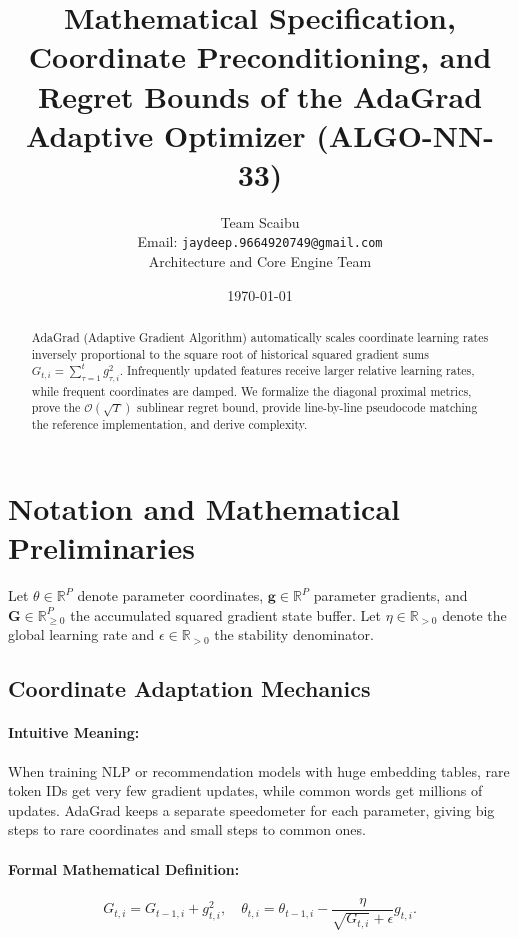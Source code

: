\documentclass[11pt]{article}
\title{\textbf{Mathematical Specification, Coordinate Preconditioning, and Regret Bounds of the AdaGrad Adaptive Optimizer (ALGO-NN-33)}}
\author{Team Scaibu \\ \small Email: \texttt{jaydeep.9664920749@gmail.com} \\ \small Architecture and Core Engine Team}
\date{\today}
\begin{document}
\maketitle

\begin{abstract}
AdaGrad (Adaptive Gradient Algorithm) automatically scales coordinate learning rates inversely proportional to the square root of historical squared gradient sums $G_{t, i} = \sum_{\tau=1}^t g_{\tau, i}^2$. Infrequently updated features receive larger relative learning rates, while frequent coordinates are damped. We formalize the diagonal proximal metrics, prove the $\mathcal{O}(\sqrt{T})$ sublinear regret bound, provide line-by-line pseudocode matching the reference implementation, and derive complexity.
\end{abstract}

\section{Notation and Mathematical Preliminaries}
\label{sec:notation}

Let $\theta \in \mathbb{R}^P$ denote parameter coordinates, $\mathbf{g} \in \mathbb{R}^P$ parameter gradients, and $\mathbf{G} \in \mathbb{R}_{\ge 0}^P$ the accumulated squared gradient state buffer. Let $\eta \in \mathbb{R}_{>0}$ denote the global learning rate and $\epsilon \in \mathbb{R}_{>0}$ the stability denominator.

\subsection{Coordinate Adaptation Mechanics}
\paragraph{Intuitive Meaning:} When training NLP or recommendation models with huge embedding tables, rare token IDs get very few gradient updates, while common words get millions of updates. AdaGrad keeps a separate speedometer for each parameter, giving big steps to rare coordinates and small steps to common ones.

\paragraph{Formal Mathematical Definition:}
\begin{equation}
\label{eq:adagrad_update}
G_{t, i} = G_{t-1, i} + g_{t, i}^2, \quad \theta_{t, i} = \theta_{t-1, i} - \frac{\eta}{\sqrt{G_{t, i}} + \epsilon} g_{t, i}.
\end{equation}
\end{document}
